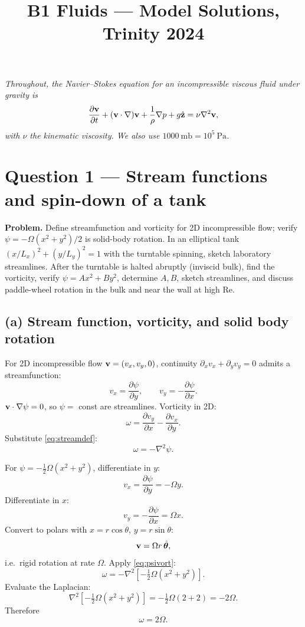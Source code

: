 \documentclass[11pt]{article}
\title{B1 Fluids --- Model Solutions, Trinity 2024}
\author{}
\date{}
\newcommand{\pd}[2]{\frac{\partial #1}{\partial #2}}
\newcommand{\Lap}{\nabla^{2}}
\begin{document}
\maketitle

\noindent\textit{Throughout, the Navier--Stokes equation for an incompressible viscous fluid under gravity is}
\begin{equation}
\pd{\vb v}{t} + (\vb v \cdot \nabla)\vb v + \frac{1}{\rho}\nabla p + g\hat{\vb z} = \nu \Lap \vb v,
\label{eq:NS}
\end{equation}
\textit{with $\nu$ the kinematic viscosity. We also use $1000~\text{mb}=10^{5}~\text{Pa}$.}

\section*{Question 1 --- Stream functions and spin-down of a tank}

\textbf{Problem.} Define streamfunction and vorticity for 2D incompressible flow; verify $\psi=-\Omega(x^2+y^2)/2$ is solid-body rotation. In an elliptical tank $(x/L_x)^2+(y/L_y)^2=1$ with the turntable spinning, sketch laboratory streamlines. After the turntable is halted abruptly (inviscid bulk), find the vorticity, verify $\psi=Ax^2+By^2$, determine $A,B$, sketch streamlines, and discuss paddle-wheel rotation in the bulk and near the wall at high Re.

\subsection*{(a) Stream function, vorticity, and solid body rotation}

For 2D incompressible flow $\vb v=(v_x,v_y,0)$, continuity $\partial_x v_x+\partial_y v_y=0$ admits a streamfunction:
\begin{equation}
v_x = \pd{\psi}{y}, \qquad v_y = -\pd{\psi}{x}.
\label{eq:streamdef}
\end{equation}
$\vb v\cdot\nabla\psi=0$, so $\psi=$ const are streamlines. Vorticity in 2D:
\begin{equation}
\omega = \pd{v_y}{x}-\pd{v_x}{y}.
\label{eq:vortdef}
\end{equation}
Substitute \eqref{eq:streamdef}:
\begin{equation}
\omega = -\Lap\psi.
\label{eq:psivort}
\end{equation}

For $\psi=-\tfrac12\Omega(x^2+y^2)$, differentiate in $y$:
\[ v_x = \pd{\psi}{y} = -\Omega y. \]
Differentiate in $x$:
\[ v_y = -\pd{\psi}{x} = \Omega x. \]
Convert to polars with $x=r\cos\theta$, $y=r\sin\theta$:
\[ \vb v = \Omega r\,\hat{\bm\theta}, \]
i.e.\ rigid rotation at rate $\Omega$. Apply \eqref{eq:psivort}:
\[ \omega = -\Lap\!\left[-\tfrac12\Omega(x^2+y^2)\right]. \]
Evaluate the Laplacian:
\[ \Lap\!\left[-\tfrac12\Omega(x^2+y^2)\right] = -\tfrac12\Omega(2+2) = -2\Omega. \]
Therefore
\begin{equation}
\boxed{\;\omega = 2\Omega.\;}
\end{equation}
\end{document}
